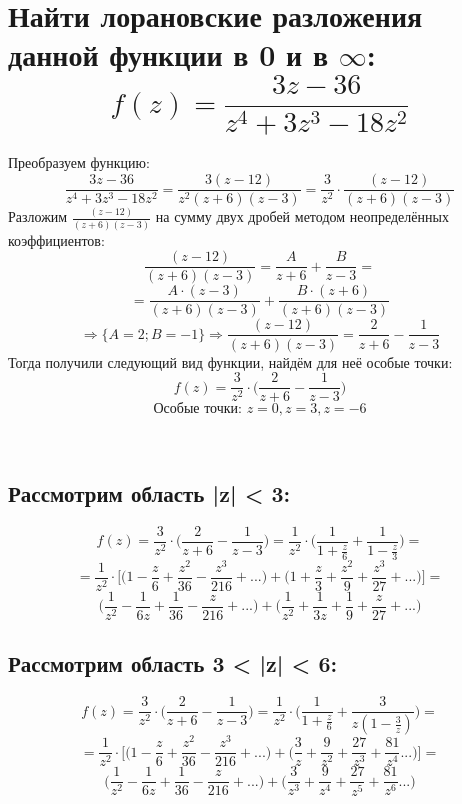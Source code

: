 \documentclass[12pt]{article}
\begin{document}
\section{Найти лорановские разложения данной функции в 0 и в $\infty$: $$f(z) = \frac{3z - 36}{z^4 + 3z^3 - 18z^2}$$}
Преобразуем функцию:
$$\frac{3z - 36}{z^4 + 3z^3 - 18z^2} = \frac{3(z - 12)}{z^2(z + 6)(z - 3)} = \frac{3}{z^2} \cdot \frac{(z - 12)}{(z + 6)(z - 3)}$$
Разложим $\frac{(z - 12)}{(z + 6)(z - 3)}$ на сумму двух дробей методом неопределённых коэффициентов:
$$\frac{(z - 12)}{(z + 6)(z - 3)} = \frac{A}{z + 6} + \frac{B}{z - 3} =$$
$$= \frac{A \cdot (z - 3)}{(z + 6)(z - 3)} + \frac{B \cdot (z + 6)}{(z + 6)(z - 3)}$$
$$\Longrightarrow \{A = 2; B = -1\} \Longrightarrow \frac{(z - 12)}{(z + 6)(z - 3)} = \frac{2}{z + 6} - \frac{1}{z - 3}$$
Тогда получили следующий вид функции, найдём для неё особые точки:
$$f(z) = \frac{3}{z^2} \cdot \bigg(\frac{2}{z + 6} - \frac{1}{z - 3}\bigg)$$
$$\text{Особые точки: } z = 0, z = 3, z = -6$$
\\
\subsection*{Рассмотрим область |z| < 3:}
$$f(z) = \frac{3}{z^2} \cdot \bigg(\frac{2}{z + 6} - \frac{1}{z - 3}\bigg) = \frac{1}{z^2} \cdot \bigg(\frac{1}{1 + \frac{z}{6}} + \frac{1}{1 - \frac{z}{3}}\bigg) =$$
$$= \frac{1}{z^2} \cdot \bigg[ \bigg(1 - \frac{z}{6} + \frac{z^2}{36} - \frac{z^3}{216} + ...\bigg) + \bigg(1 + \frac{z}{3} + \frac{z^2}{9} + \frac{z^3}{27} + ...\bigg) \bigg] =$$
$$\bigg(\frac{1}{z^2} - \frac{1}{6z} + \frac{1}{36} - \frac{z}{216} + ...\bigg) + \bigg(\frac{1}{z^2} + \frac{1}{3z} + \frac{1}{9} + \frac{z}{27} + ...\bigg)$$
\subsection*{Рассмотрим область 3 < |z| < 6:}
$$f(z) = \frac{3}{z^2} \cdot \bigg(\frac{2}{z + 6} - \frac{1}{z - 3}\bigg) = \frac{1}{z^2} \cdot \bigg(\frac{1}{1 + \frac{z}{6}} + \frac{3}{z(1 - \frac{3}{z})}\bigg) =$$
$$= \frac{1}{z^2} \cdot \bigg[ \bigg(1 - \frac{z}{6} + \frac{z^2}{36} - \frac{z^3}{216} + ...\bigg) + \bigg(\frac{3}{z} + \frac{9}{z^2} + \frac{27}{z^3} + \frac{81}{z^4} ...\bigg) \bigg] =$$
$$\bigg(\frac{1}{z^2} - \frac{1}{6z} + \frac{1}{36} - \frac{z}{216} + ...\bigg) + \bigg(\frac{3}{z^3} + \frac{9}{z^4} + \frac{27}{z^5} + \frac{81}{z^6} ...\bigg)$$
\end{document}

